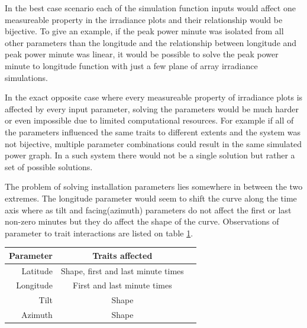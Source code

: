 \noindent In the best case scenario each of the simulation function inputs would affect one measureable property in the irradiance plots and their relationship would be bijective. To give an example, if the peak power minute was isolated from all other parameters than the longitude and the relationship between longitude and peak power minute was linear, it would be possible to solve the peak power minute to longitude function with just a few plane of array irradiance simulations.

In the exact opposite case where every measureable property of irradiance plots is affected by every input parameter, solving the parameters would be much harder or even impossible due to limited computational resources. For example if all of the parameters influenced the same traits to different extents and the system was not bijective, multiple parameter combinations could result in the same simulated power graph. In a such system there would not be a single solution but rather a set of possible solutions.

The problem of solving installation parameters lies somewhere in between the two extremes. The longitude parameter would seem to shift the curve along the time axis where as tilt and facing(azimuth) parameters do not affect the first or last non-zero minutes but they do affect the shape of the curve. Observations of parameter to trait interactions are listed on table \ref{table_traits}.



\begin{table}[H]
\centering
\begin{tabular}{r|cc} \hline\hline

 Parameter & Traits affected\\ \hline
 Latitude & Shape, first and last minute times\\
 Longitude & First and last minute times\\
 Tilt & Shape\\
 Azimuth & Shape\\

\hline\hline
\end{tabular}
\label{table_traits}
\end{table}






